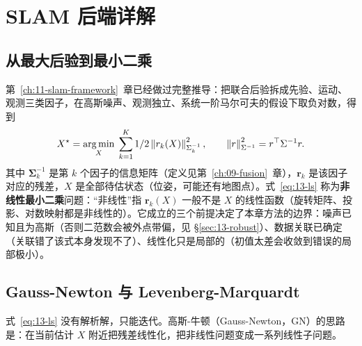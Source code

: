 \usetikzlibrary{arrows.meta, positioning}

\chapter{SLAM 后端详解}\label{ch:13-backend}


\section{从最大后验到最小二乘}\label{sec:13-map2ls}

第~\ref{ch:11-slam-framework}~章已经做过完整推导：把联合后验拆成先验、运动、观测三类因子，在高斯噪声、观测独立、系统一阶马尔可夫的假设下取负对数，得到
\begin{equation}
X^{\star}=\operatorname*{arg\,min}_{X}\;\sum_{k=1}^{K}1/2\left\lVert r_k(X) \right\rVert_{\Sigma_k^{-1}}^{2},
\qquad
\left\lVert r \right\rVert_{\Sigma^{-1}}^{2}=r^{\top}\Sigma^{-1}r.
\label{eq:13-ls}
\end{equation}
其中 $\bm{\Sigma}_k^{-1}$ 是第 $k$ 个因子的信息矩阵（定义见第~\ref{ch:09-fusion}~章），$\bm{r}_k$ 是该因子对应的残差，$X$ 是全部待估状态（位姿，可能还有地图点）。式~\eqref{eq:13-ls} 称为\textbf{非线性最小二乘}问题：``非线性''指 $\bm{r}_k(X)$ 一般不是 $X$ 的线性函数（旋转矩阵、投影、对数映射都是非线性的）。它成立的三个前提决定了本章方法的边界：噪声已知且为高斯（否则二范数会被外点带偏，见 \S\ref{sec:13-robust}）、数据关联已确定（关联错了该式本身发现不了）、线性化只是局部的（初值太差会收敛到错误的局部极小）。

\section{Gauss-Newton 与 Levenberg-Marquardt}\label{sec:13-gn}

式~\eqref{eq:13-ls} 没有解析解，只能迭代。高斯-牛顿（Gauss-Newton，GN）的思路是：在当前估计 $X$ 附近把残差线性化，把非线性问题变成一系列线性子问题。

